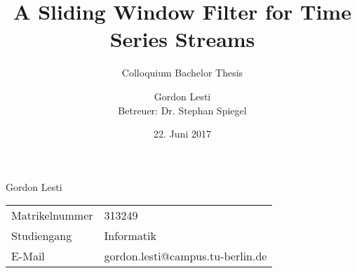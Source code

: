 \documentclass{beamer}
\begin{document}
    \graphicspath{{../img/}}
    \title{A Sliding Window Filter for Time Series Streams}
    \subtitle{Colloquium Bachelor Thesis}
    \author{Gordon Lesti\\
    {\footnotesize Betreuer: Dr. Stephan Spiegel}}
    \date{22. Juni 2017}

    \frame{\titlepage}
    \begin{frame}{Gordon Lesti}
        \begin{tabular}{ll}
            Matrikelnummer & 313249\\
            Studiengang & Informatik\\
            E-Mail & gordon.lesti@campus.tu-berlin.de
        \end{tabular}
    \end{frame}

    
    
    
    
    
\end{document}
